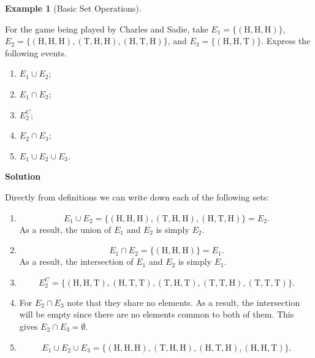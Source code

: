 \documentclass[
  letterpaper,
  DIV=11,
  numbers=noendperiod]{scrreprt}
\providecommand{\tightlist}{%
  \setlength{\itemsep}{0pt}\setlength{\parskip}{0pt}}\usepackage{longtable,booktabs,array}
\theoremstyle{definition}
\theoremstyle{definition}
\newtheorem{example}{Example}[chapter]
\theoremstyle{definition}
\theoremstyle{remark}
\begin{document}
\begin{example}[Basic Set
Operations]\protect\hypertarget{exm-basic-set-operations}{}\label{exm-basic-set-operations}

For the game being played by Charles and Sadie, take
\(E_1 = \{(\text{H}, \text{H}, \text{H})\}\),
\(E_2 = \{(\text{H}, \text{H}, \text{H}), (\text{T}, \text{H}, \text{H}), (\text{H}, \text{T}, \text{H})\}\),
and \(E_3 = \{(\text{H}, \text{H}, \text{T})\}\). Express the following
events.

\begin{enumerate}
\def\labelenumi{\alph{enumi}.}
\tightlist
\item
  \(E_1 \cup E_2\);
\item
  \(E_1 \cap E_2\);
\item
  \(E_2^C\);
\item
  \(E_2 \cap E_3\);
\item
  \(E_1 \cup E_2 \cup E_3\).
\end{enumerate}

\begin{tcolorbox}[enhanced jigsaw, colback=white, colframe=quarto-callout-color-frame, arc=.35mm, leftrule=.75mm, rightrule=.15mm, opacityback=0, breakable, bottomrule=.15mm, left=2mm, toprule=.15mm]

\vspace{-3mm}\textbf{Solution}\vspace{3mm}

Directly from definitions we can write down each of the following sets:

\begin{enumerate}
\def\labelenumi{\alph{enumi}.}
\tightlist
\item
  \[E_1 \cup E_2 =  \{(\text{H}, \text{H}, \text{H}), (\text{T}, \text{H}, \text{H}), (\text{H}, \text{T}, \text{H})\} = E_2.\]
  As a result, the union of \(E_1\) and \(E_2\) is simply
  \(E_2\).\footnotemark{}
\item
  \[E_1 \cap E_2 = \{(\text{H}, \text{H}, \text{H})\} = E_1.\] As a
  result, the intersection of \(E_1\) and \(E_2\) is simply
  \(E_1\).\footnotemark{}
\item
  \[E_2^C =  \{(\text{H},\text{H},\text{T}), (\text{H},\text{T},\text{T}), (\text{T},\text{H},\text{T}), (\text{T},\text{T},\text{H}), (\text{T},\text{T},\text{T})\}.\]
\item
  For \(E_2\cap E_3\) note that they share no elements. As a result, the
  intersection will be empty since there are no elements common to both
  of them. This gives \(E_2\cap E_3 = \emptyset\).
\item
  \[E_1 \cup E_2 \cup E_3 = \{(\text{H}, \text{H}, \text{H}), (\text{T}, \text{H}, \text{H}), (\text{H}, \text{T}, \text{H}), (\text{H}, \text{H}, \text{T})\}.\]
\end{enumerate}


\end{tcolorbox}
\end{example}
\end{document}
